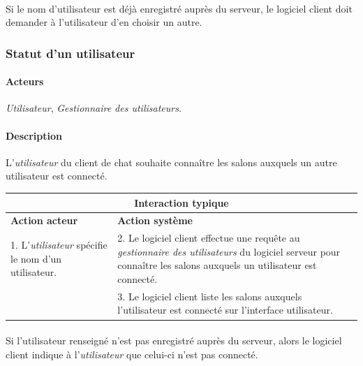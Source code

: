 \documentclass[a4paper]{article}
\begin{document}
    \paragraph{}Si le nom d'utilisateur est déjà enregistré auprès du serveur,
    le logiciel client doit demander à l'utilisateur d'en choisir un autre.

   \subsubsection{Statut d'un utilisateur}
    \paragraph{Acteurs} \textit{Utilisateur},
    \textit{Gestionnaire des utilisateurs}.

    \paragraph{Description} L'\textit{utilisateur} du client de chat souhaite
    connaître les salons auxquels un autre utilisateur est connecté.

    \begin{center}
        \begin{tabular}{|p{6cm}|p{6cm}|}
            \hline
            \multicolumn{2}{|c|}{\textbf{Interaction typique}} \\ \hline
            \textbf{Action acteur} & \textbf{Action système} \\ \hline
            1. L'\textit{utilisateur} spécifie le nom d'un utilisateur. &
            2. Le logiciel client effectue une requête au
            \textit{gestionnaire des utilisateurs} du logiciel serveur pour
            connaître les salons auxquels un utilisateur est connecté. \\
            & 3. Le logiciel client liste les salons auxquels l'utilisateur
            est connecté sur l'interface utilisateur. \\
            \hline
        \end{tabular}
    \end{center}

    \paragraph{}Si l'utilisateur renseigné n'est pas enregistré auprès du
    serveur, alors le logiciel client indique à l'\textit{utilisateur} que
    celui-ci n'est pas connecté.
\end{document}

